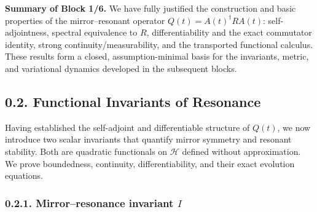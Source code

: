 \medskip

\noindent\textbf{Summary of Block 1/6.}
We have fully justified the construction and basic properties of the mirror–resonant operator $Q(t)=A(t)^\dagger R A(t)$: self-adjointness, spectral equivalence to $R$, differentiability and the exact commutator identity, strong continuity/measurability, and the transported functional calculus.
These results form a closed, assumption-minimal basis for the invariants, metric, and variational dynamics developed in the subsequent blocks.




\subsection*{0.2. Functional Invariants of Resonance}

\noindent
Having established the self-adjoint and differentiable structure of $Q(t)$,
we now introduce two scalar invariants that quantify mirror symmetry and resonant stability.
Both are quadratic functionals on $\mathcal{H}$ defined without approximation.
We prove boundedness, continuity, differentiability, and their exact evolution equations.

\subsubsection*{0.2.1. Mirror–resonance invariant $I$}

